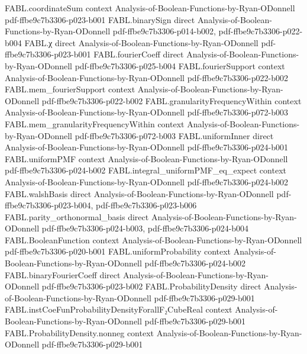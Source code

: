 \begin{theorem}
\proofstep
  {FABL.coordinateSum}
  {context}
  {Analysis-of-Boolean-Functions-by-Ryan-ODonnell}
  {pdf-ffbe9c7b3306-p023-b001}
\proofstep
  {FABL.binarySign}
  {direct}
  {Analysis-of-Boolean-Functions-by-Ryan-ODonnell}
  {pdf-ffbe9c7b3306-p014-b002,
    pdf-ffbe9c7b3306-p022-b004}
\proofstep
  {FABL.χ}
  {direct}
  {Analysis-of-Boolean-Functions-by-Ryan-ODonnell}
  {pdf-ffbe9c7b3306-p023-b001}
\proofstep
  {FABL.fourierCoeff}
  {direct}
  {Analysis-of-Boolean-Functions-by-Ryan-ODonnell}
  {pdf-ffbe9c7b3306-p025-b004}
\proofstep
  {FABL.fourierSupport}
  {context}
  {Analysis-of-Boolean-Functions-by-Ryan-ODonnell}
  {pdf-ffbe9c7b3306-p022-b002}
\proofstep
  {FABL.mem_fourierSupport}
  {context}
  {Analysis-of-Boolean-Functions-by-Ryan-ODonnell}
  {pdf-ffbe9c7b3306-p022-b002}
\proofstep
  {FABL.granularityFrequencyWithin}
  {context}
  {Analysis-of-Boolean-Functions-by-Ryan-ODonnell}
  {pdf-ffbe9c7b3306-p072-b003}
\proofstep
  {FABL.mem_granularityFrequencyWithin}
  {context}
  {Analysis-of-Boolean-Functions-by-Ryan-ODonnell}
  {pdf-ffbe9c7b3306-p072-b003}
\proofstep
  {FABL.uniformInner}
  {direct}
  {Analysis-of-Boolean-Functions-by-Ryan-ODonnell}
  {pdf-ffbe9c7b3306-p024-b001}
\proofstep
  {FABL.uniformPMF}
  {context}
  {Analysis-of-Boolean-Functions-by-Ryan-ODonnell}
  {pdf-ffbe9c7b3306-p024-b002}
\proofstep
  {FABL.integral_uniformPMF_eq_expect}
  {context}
  {Analysis-of-Boolean-Functions-by-Ryan-ODonnell}
  {pdf-ffbe9c7b3306-p024-b002}
\proofstep
  {FABL.walshBasis}
  {direct}
  {Analysis-of-Boolean-Functions-by-Ryan-ODonnell}
  {pdf-ffbe9c7b3306-p023-b004,
    pdf-ffbe9c7b3306-p023-b006}
\proofstep
  {FABL.parity_orthonormal_basis}
  {direct}
  {Analysis-of-Boolean-Functions-by-Ryan-ODonnell}
  {pdf-ffbe9c7b3306-p024-b003,
    pdf-ffbe9c7b3306-p024-b004}
\proofstep
  {FABL.BooleanFunction}
  {context}
  {Analysis-of-Boolean-Functions-by-Ryan-ODonnell}
  {pdf-ffbe9c7b3306-p020-b001}
\proofstep
  {FABL.uniformProbability}
  {context}
  {Analysis-of-Boolean-Functions-by-Ryan-ODonnell}
  {pdf-ffbe9c7b3306-p024-b002}
\proofstep
  {FABL.binaryFourierCoeff}
  {direct}
  {Analysis-of-Boolean-Functions-by-Ryan-ODonnell}
  {pdf-ffbe9c7b3306-p023-b002}
\proofstep
  {FABL.ProbabilityDensity}
  {direct}
  {Analysis-of-Boolean-Functions-by-Ryan-ODonnell}
  {pdf-ffbe9c7b3306-p029-b001}
\proofstep
  {FABL.instCoeFunProbabilityDensityForallF₂CubeReal}
  {context}
  {Analysis-of-Boolean-Functions-by-Ryan-ODonnell}
  {pdf-ffbe9c7b3306-p029-b001}
\proofstep
  {FABL.ProbabilityDensity.nonneg}
  {context}
  {Analysis-of-Boolean-Functions-by-Ryan-ODonnell}
  {pdf-ffbe9c7b3306-p029-b001}

\end{theorem}
